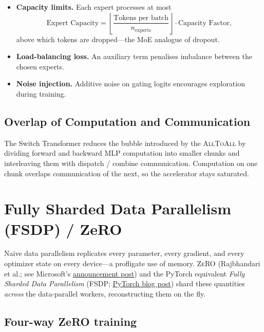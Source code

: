 \documentclass[11pt,a4paper]{article}
\theoremstyle{definition}
\theoremstyle{remark}
\theoremstyle{plain}
\begin{document}
\begin{itemize}[leftmargin=1.5em, itemsep=2pt]
    \item \textbf{Capacity limits.} Each expert processes at most
    \begin{equation}
    \text{Expert Capacity} = \left\lfloor \frac{\text{Tokens per batch}}{n_{\text{experts}}}
    \right\rfloor \cdot \text{Capacity Factor},
    \end{equation}
    above which tokens are dropped---the MoE analogue of dropout.
    \item \textbf{Load-balancing loss.} An auxiliary term penalises
    imbalance between the chosen experts.
    \item \textbf{Noise injection.} Additive noise on gating logits
    encourages exploration during training.
\end{itemize}

\subsection{Overlap of Computation and Communication}

The Switch Transformer reduces the bubble introduced by the
\textsc{AllToAll} by dividing forward and backward MLP computation into
smaller chunks and interleaving them with dispatch / combine
communication. Computation on one chunk overlaps communication of the
next, so the accelerator stays saturated.

\section{Fully Sharded Data Parallelism (FSDP) / ZeRO}

Naive data parallelism replicates every parameter, every gradient, and
every optimizer state on every device---a profligate use of memory.
\textsc{ZeRO} (Rajbhandari et al.; see Microsoft's
\href{https://www.microsoft.com/en-us/research/blog/zero-deepspeed-new-system-optimizations-enable-training-models-with-over-100-billion-parameters/}{announcement
post}) and the PyTorch equivalent \emph{Fully Sharded Data Parallelism}
(FSDP;
\href{https://pytorch.org/blog/introducing-pytorch-fully-sharded-data-parallel-api/}{PyTorch
blog post}) shard these quantities \emph{across} the data-parallel
workers, reconstructing them on the fly.

\subsection{Four-way ZeRO training}
\end{document}
